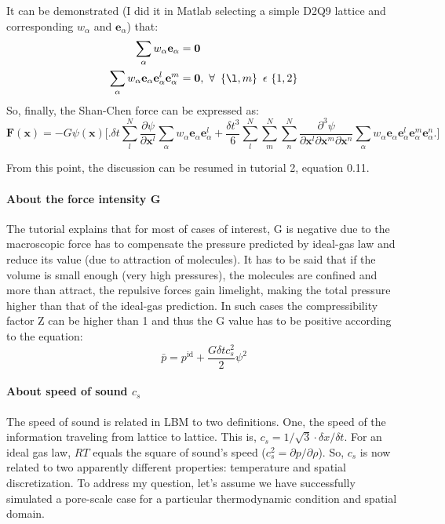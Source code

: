 \documentclass{article}
\begin{document}
	It can be demonstrated (I did it in Matlab selecting a simple D2Q9 lattice and corresponding $w_\alpha$ and $\mathbf{e}_\alpha$) that:
	\begin{equation*}
	\begin{split}
		\sum_\alpha w_\alpha \mathbf{e}_\alpha & = \mathbf{0}\\ \sum_\alpha w_\alpha \mathbf{e}_\alpha \mathbf{e}_\alpha^l \mathbf{e}_\alpha^m & = \mathbf{0}, \, \, \forall \, \, \left\{\l,m \right\} \, \, \epsilon \, \left\{1,2\right\}
	\end{split}
	\end{equation*}
	So, finally, the Shan-Chen force can be expressed as:
	\begin{equation*}
		\mathbf{F}(\mathbf{x}) = -G \psi (\mathbf{x}) \big[ \big.  \delta t \sum_{l}^{N} \frac{\partial \psi}{\partial \mathbf{x}^l} \sum_\alpha w_\alpha \mathbf{e}_\alpha \mathbf{e}_\alpha^l + \frac{\delta t^3}{6} \sum_{l}^{N} \sum_{m}^{N} \sum_{n}^{N} \frac{\partial^3 \psi}{\partial \mathbf{x}^l \partial \mathbf{x}^m \partial \mathbf{x}^n} \sum_\alpha w_\alpha \mathbf{e}_\alpha \mathbf{e}_\alpha^l \mathbf{e}_\alpha^m \mathbf{e}_\alpha^n  \big. \big]
	\end{equation*}

	From this point, the discussion can be resumed in tutorial 2, equation 0.11.
	
	\paragraph{About the force intensity G} 
	The tutorial explains that for most of cases of interest, G is negative due to the macroscopic force has to compensate the pressure predicted by ideal-gas law and reduce its value (due to attraction of molecules). It has to be said that if the volume is small enough (very high pressures), the molecules are confined and more than attract, the repulsive forces gain limelight, making the total pressure higher than that of the ideal-gas prediction. In such cases the compressibility factor Z can be higher than 1 and thus the G value has to be positive according to the equation:
	\begin{equation}
		\bar{p} = p^{\text{id}} + \frac{G \delta t c^2_s}{2} \psi^2
	\end{equation}
	
	\paragraph{About speed of sound $c_s$} The speed of sound is related in LBM to two definitions. One, the speed of the information traveling from lattice to lattice. This is, $c_s = 1/\sqrt{3} \cdot \delta x / \delta t$. For an ideal gas law, $RT$ equals the square of sound's speed ($c_s^2=\partial p/\partial \rho$). So, $c_s$ is now related to two apparently different properties: temperature and spatial discretization. To address my question, let's assume we have successfully simulated a pore-scale case for a particular thermodynamic condition and spatial domain. 
	
\end{document}
